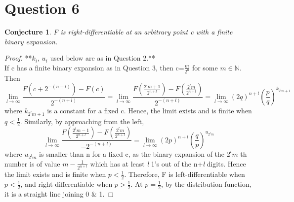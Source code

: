 \documentclass[11pt]{article}
\begin{document}
\section*{Question 6}
\newtheorem{conjecture}{Conjecture}
\begin{conjecture}
F is right-differentiable at an arbitrary point c with a finite binary expansion.
\end{conjecture}
\begin{proof} 


**$k_{i}$, $u_{i}$ used below are as in Question 2.**
\\If c has a finite binary expansion as in Question 3, then c=$\frac{m}{2^n}$ for some $ m\in \mathbb{N}$.
Then$$\lim_{l \to \infty}\frac{F(c+2^{-(n+l)})-F(c)}{2^{-(n+l)}}=\lim_{l \to \infty}\frac{F(\frac{2^lm+1}{2^{n+l}})-F(\frac{2^{l}m}{2^{n+l}})}{2^{-(n+l)}}=\lim_{l \to \infty} (2q)^{n+l} (\frac{p}{q})^{k_{2^lm+1}}$$
where $ k_{2^lm+1}$ is a constant for a fixed c.
Hence, the limit exists and is finite when $q<\frac{1}{2}$.
Similarly, by approaching from the left,
$$\lim_{l \to \infty}\frac{F(\frac{2^lm-1}{2^{n+l}})-F(\frac{2^{l}m}{2^{n+l}})}{-2^{-(n+l)}}=\lim_{l \to \infty} (2p)^{n+l} (\frac{q}{p})^{u_{2^lm}}$$
where $u_{2^{l}m}$ is smaller than n for a fixed c, as the binary expansion of the $2^{l}m$ th number is of value $m{-}\frac{1}{2^{n+l}}$ which has at least \textit{l} 1's out of the n+\textit{l} digits.
Hence the limit exists and is finite when $p<\frac{1}{2}$. 
Therefore, F is left-differentiable when $p<\frac{1}{2}$, and right-differentiable when $p>\frac{1}{2}$.
At $p = \frac{1}{2}$, by the distribution function, it is a straight line joining 0 \& 1.
\end{proof}
\end{document}
